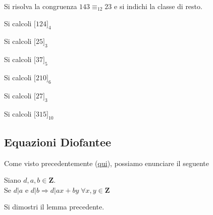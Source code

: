 \begin{flushleft}
\begin{esercizio}
Si risolva la congruenza $143 \equiv_{12} 23$ e si indichi la classe di resto.
\end{esercizio}
\vspace{150px}

\begin{esercizio}
Si calcoli $\big[124\big]_4$
\end{esercizio}
\vspace{100px}

\begin{esercizio}
Si calcoli $\big[25\big]_3$
\end{esercizio}
\vspace{100px}

\begin{esercizio}
Si calcoli $\big[37\big]_5$
\end{esercizio}
\vspace{100px}

\begin{esercizio}
Si calcoli $\big[210\big]_6$
\end{esercizio}
\vspace{100px}

\begin{esercizio}
Si calcoli $\big[27\big]_3$
\end{esercizio}
\vspace{100px}

\begin{esercizio}
Si calcoli $\big[315\big]_{10}$
\end{esercizio}
\vspace{100px}


\subsection{Equazioni Diofantee}
Come visto precedentemente (\hyperlink{lemma1diofantee}{qui}), possiamo enunciare il seguente
\begin{lemma}
Siano $d, a, b \in \mathbf{Z}$.\\
Se $d|a$ e $d|b \Rightarrow d|ax + by\;\forall x,y \in \mathbf{Z}$
\end{lemma}
\begin{esercizio}
Si dimostri il lemma precedente.
\end{esercizio}
\vspace{150px}


\end{flushleft}
